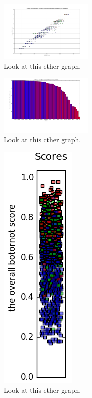 \documentclass{sig-alternate-05-2015}
\begin{document}
\begin{figure}
	\caption{Look at this other graph.}
	\centering
		\includegraphics[width=0.4\textwidth]{imgs/csvsourclusterscoresubscore}
\end{figure}

\begin{figure}
	\caption{Look at this other graph.}
	\centering
		\includegraphics[width=0.4\textwidth]{imgs/rtubycourclusterscoresubscore}
\end{figure}

\begin{figure}
	\caption{Look at this other graph.}
	\centering
		\includegraphics{imgs/scorenbotcolor}
\end{figure}
\end{document}
